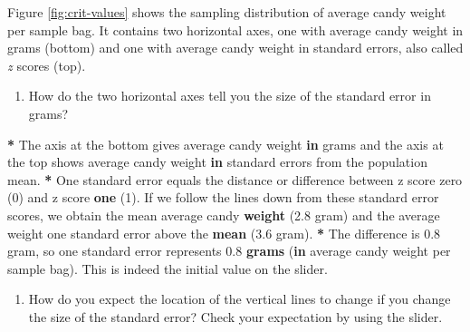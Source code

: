 \documentclass[a4paper]{book}
\newenvironment{Shaded}{\begin{snugshade}}{\end{snugshade}}
\newcommand{\KeywordTok}[1]{\textcolor[rgb]{0,0,0}{\textbf{#1}}}
\newcommand{\DecValTok}[1]{\textcolor[rgb]{0.00,0.00,0.00}{#1}}
\newcommand{\FloatTok}[1]{\textcolor[rgb]{0.00,0.00,0.00}{#1}}
\newcommand{\StringTok}[1]{\textcolor[rgb]{0.00,0.00,0.00}{#1}}
\newcommand{\ControlFlowTok}[1]{\textcolor[rgb]{0.00,0.00,0.00}{\textbf{#1}}}
\newcommand{\OperatorTok}[1]{\textcolor[rgb]{0.00,0.00,0.00}{\textbf{#1}}}
\newcommand{\NormalTok}[1]{#1}
\providecommand{\tightlist}{%
  \setlength{\itemsep}{0pt}\setlength{\parskip}{0pt}}
\theoremstyle{definition}
\theoremstyle{definition}
\theoremstyle{definition}
\theoremstyle{remark}
\begin{document}
Figure \ref{fig:crit-values} shows the sampling distribution of average
candy weight per sample bag. It contains two horizontal axes, one with
average candy weight in grams (bottom) and one with average candy weight
in standard errors, also called \emph{z} scores (top).

\begin{enumerate}
\def\labelenumi{\arabic{enumi}.}
\tightlist
\item
  How do the two horizontal axes tell you the size of the standard error
  in grams?
\end{enumerate}

\begin{Shaded}
\begin{Highlighting}[]
\OperatorTok{*}\StringTok{ }\NormalTok{The axis at the bottom gives average candy weight }\ControlFlowTok{in}\NormalTok{ grams and the axis at}
\NormalTok{the top shows average candy weight }\ControlFlowTok{in}\NormalTok{ standard errors from the population}
\NormalTok{mean.}
\OperatorTok{*}\StringTok{ }\NormalTok{One standard error equals the distance or difference between z score zero}
\NormalTok{(}\DecValTok{0}\NormalTok{) and z score }\KeywordTok{one}\NormalTok{ (}\DecValTok{1}\NormalTok{). If we follow the lines down from these standard error}
\NormalTok{scores, we obtain the mean average candy }\KeywordTok{weight}\NormalTok{ (}\FloatTok{2.8}\NormalTok{ gram) and the average}
\NormalTok{weight one standard error above the }\KeywordTok{mean}\NormalTok{ (}\FloatTok{3.6}\NormalTok{ gram).}
\OperatorTok{*}\StringTok{ }\NormalTok{The difference is }\FloatTok{0.8}\NormalTok{ gram, so one standard error represents }\FloatTok{0.8} \KeywordTok{grams}\NormalTok{ (}\ControlFlowTok{in}
\NormalTok{average candy weight per sample bag). This is indeed the initial value on the}
\NormalTok{slider.}
\end{Highlighting}
\end{Shaded}

\begin{enumerate}
\def\labelenumi{\arabic{enumi}.}
\setcounter{enumi}{1}
\tightlist
\item
  How do you expect the location of the vertical lines to change if you
  change the size of the standard error? Check your expectation by using
  the slider.
\end{enumerate}
\end{document}
